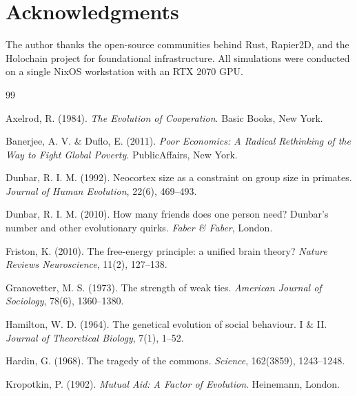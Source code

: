 \documentclass[12pt,a4paper]{article}
\begin{document}
\section*{Acknowledgments}

The author thanks the open-source communities behind Rust, Rapier2D, and the Holochain project for foundational infrastructure. All simulations were conducted on a single NixOS workstation with an RTX 2070 GPU.

\begin{thebibliography}{99}

Axelrod, R. (1984).
\emph{The Evolution of Cooperation}.
Basic Books, New York.

Banerjee, A. V. \& Duflo, E. (2011).
\emph{Poor Economics: A Radical Rethinking of the Way to Fight Global Poverty}.
PublicAffairs, New York.

Dunbar, R. I. M. (1992).
Neocortex size as a constraint on group size in primates.
\emph{Journal of Human Evolution}, 22(6), 469--493.

Dunbar, R. I. M. (2010).
How many friends does one person need? Dunbar's number and other evolutionary quirks.
\emph{Faber \& Faber}, London.

Friston, K. (2010).
The free-energy principle: a unified brain theory?
\emph{Nature Reviews Neuroscience}, 11(2), 127--138.

Granovetter, M. S. (1973).
The strength of weak ties.
\emph{American Journal of Sociology}, 78(6), 1360--1380.

Hamilton, W. D. (1964).
The genetical evolution of social behaviour. I \& II.
\emph{Journal of Theoretical Biology}, 7(1), 1--52.

Hardin, G. (1968).
The tragedy of the commons.
\emph{Science}, 162(3859), 1243--1248.

Kropotkin, P. (1902).
\emph{Mutual Aid: A Factor of Evolution}.
Heinemann, London.


\end{thebibliography}
\end{document}
